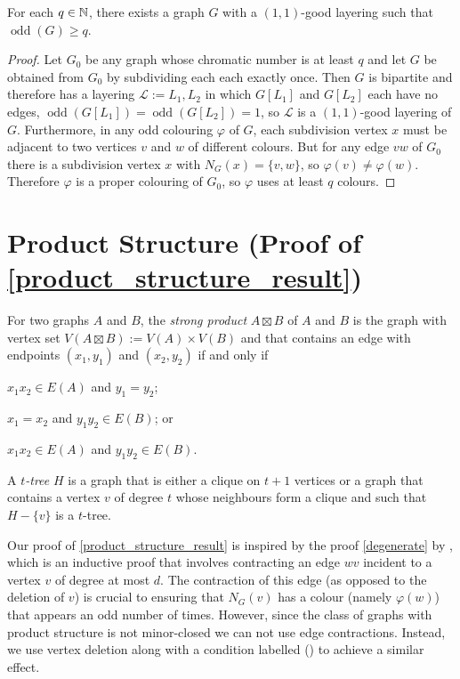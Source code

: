 \documentclass{patmorin}
\DeclareMathOperator{\odd}{odd}
\begin{document}
\begin{obs}
  For each $q\in\mathbb{N}$, there exists a graph $G$ with a $(1,1)$-good layering such that $\odd(G)\ge q$.
\end{obs}

\begin{proof}
  Let $G_0$ be any graph whose chromatic number is at least $q$ and let $G$ be obtained from $G_0$ by subdividing each each exactly once.  Then $G$ is bipartite and therefore has a layering $\mathcal{L}:=L_1,L_2$ in which $G[L_1]$ and $G[L_2]$ each have no edges, $\odd(G[L_1])=\odd(G[L_2])=1$, so $\mathcal{L}$ is a $(1,1)$-good layering of $G$.  Furthermore, in any odd colouring $\varphi$ of $G$, each subdivision vertex $x$ must be adjacent to two vertices $v$ and $w$ of different colours.  But for any edge $vw$ of $G_0$ there is a subdivision vertex $x$ with $N_G(x)=\{v,w\}$, so $\varphi(v)\neq\varphi(w)$.  Therefore $\varphi$ is a proper colouring of $G_0$, so $\varphi$ uses at least $q$ colours.
\end{proof}

\section{Product Structure (Proof of \cref{product_structure_result})}
\label{product_structure}

For two graphs $A$ and $B$, the \emph{strong product} $A\boxtimes B$ of $A$ and $B$ is the graph with vertex set $V(A\boxtimes B):=V(A)\times V(B)$ and that contains an edge with endpoints $(x_1,y_1)$ and $(x_2,y_2)$ if and only if
\begin{inparaenum}[(i)]
  \item $x_1x_2\in E(A)$ and $y_1=y_2$;
  \item $x_1=x_2$ and $y_1y_2\in E(B)$; or
  \item $x_1x_2\in E(A)$ and $y_1y_2\in E(B)$.
\end{inparaenum}
A \emph{$t$-tree} $H$ is a graph that is either a clique on $t+1$ vertices or a graph that contains a vertex $v$ of degree $t$ whose neighbours form a clique and such that $H-\{v\}$ is a $t$-tree. 

Our proof of \cref{product_structure_result} is inspired by the proof \cref{degenerate} by \citet{cranston.lafferty.ea:note}, which is an inductive proof that involves contracting an edge $wv$ incident to a vertex $v$ of degree at most $d$.  The contraction of this edge (as opposed to the deletion of $v$) is crucial to ensuring that $N_G(v)$ has a colour (namely $\varphi(w)$) that appears an odd number of times.  However, since the class of graphs with product structure is not minor-closed we can not use edge contractions. Instead, we use vertex deletion along with a condition labelled () to achieve a similar effect.
\end{document}
